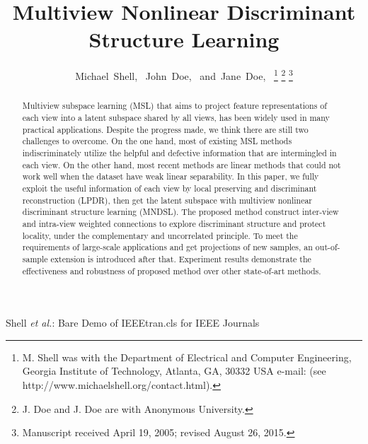 \documentclass[journal]{IEEEtran}
\begin{document}
\title{Multiview Nonlinear Discriminant\\Structure Learning}


\author{Michael~Shell,~
        John~Doe,~
        and~Jane~Doe,~%
\thanks{M. Shell was with the Department
of Electrical and Computer Engineering, Georgia Institute of Technology, Atlanta,
GA, 30332 USA e-mail: (see http://www.michaelshell.org/contact.html).}%
\thanks{J. Doe and J. Doe are with Anonymous University.}%
\thanks{Manuscript received April 19, 2005; revised August 26, 2015.}}



%
{Shell \MakeLowercase{\textit{et al.}}: Bare Demo of IEEEtran.cls for IEEE Journals}



\maketitle

\begin{abstract}
Multiview subspace learning (MSL) that aims to project feature representations of each view into a latent subspace shared by all views, has been widely used in many practical applications. 
Despite the progress made, we think there are still two challenges to overcome. 
On the one hand, most of existing MSL methods indiscriminately utilize the helpful and defective information that are intermingled in each view. 
On the other hand, most recent methods are linear methods that could not work well when the dataset have weak linear separability. 
In this paper, we fully exploit the useful information of each view by local preserving and discriminant reconstruction (LPDR), then get the latent subspace with multiview nonlinear discriminant structure learning (MNDSL). 
The proposed method construct inter-view and intra-view weighted connections to explore discriminant structure and protect locality, under the complementary and uncorrelated principle. 
To meet the requirements of large-scale applications and get projections of new samples, an out-of-sample extension is introduced after that. 
Experiment results demonstrate the effectiveness and robustness of proposed method over other state-of-art methods. 

\end{abstract}
\end{document}
